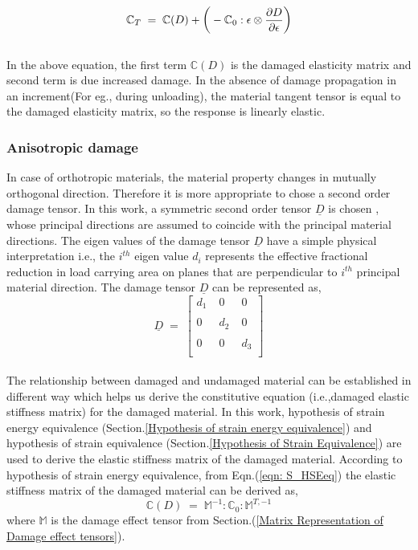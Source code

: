 \documentclass[a4paper,12pt]{extarticle}
\begin{document}
\begin{equation}
\large{\mathbb{C}_{T}  \; = \; \mathbb{C}(D) + \Big(-\mathbb{C}_{0} : \epsilon \otimes \frac{\partial D}{\partial \epsilon }\Big)    }
\end{equation}
\\
In the above equation, the first term $\mathbb{C}(D)$ is the damaged elasticity matrix and second term is due increased damage. In the absence of damage propagation in an increment(For eg., during unloading), the material tangent tensor is equal to the damaged elasticity matrix, so the response is linearly elastic.
\subsubsection{Anisotropic damage}
\indent\indent\indent In case of orthotropic materials, the material property changes in mutually orthogonal direction. Therefore it is more appropriate to chose a second order damage tensor. In this work, a symmetric second order tensor $\underline{D}$ is chosen , whose principal directions are assumed to coincide with the principal material directions. The eigen values of the damage tensor $\underline{D}$ have a simple physical interpretation i.e., the $i^{th}$ eigen value $d_{i}$ represents the effective fractional reduction in load carrying area on planes that are perpendicular to $i^{th}$ principal material direction. The damage tensor $\underline{D}$ can be represented as,\\
$$
\underline{D} \; = \; 
 \begin{bmatrix}
  d_{1}  \;& 0  \; & 0  \\
  \\
  0 \; & d_{2} \; & 0  \\
  \\  
  0 \; & 0 \; & d_{3} \\
  
 \end{bmatrix}
 $$  
\\
The relationship between damaged and undamaged material can be established in different way which helps us derive the constitutive equation (i.e.,damaged elastic stiffness matrix) for the damaged material. In this work, hypothesis of strain energy equivalence (Section.\ref{Hypothesis of strain energy equivalence}) and hypothesis of strain equivalence (Section.\ref{Hypothesis of Strain Equivalence}) are used to derive the elastic stiffness matrix of the damaged material. According to hypothesis of strain energy equivalence, from Eqn.(\ref{eqn: S_HSEeq}) the elastic stiffness matrix of the damaged material can be derived as,\\
\begin{equation}
\mathbb{C}(D) \; = \; \mathbb{M}^{-1} : \mathbb{C}_{0} :  \mathbb{M}^{T,-1}  
\label{Damaged_elasticity_matrix_1}
\end{equation}
where $\mathbb{M}$ is the damage effect tensor from Section.(\ref{Matrix Representation of Damage effect tensors}). 
\end{document}
